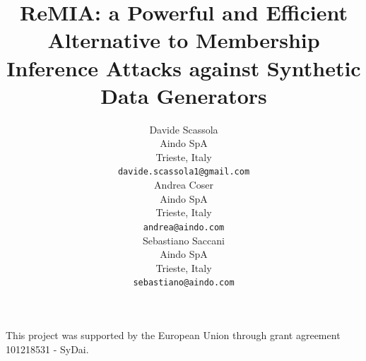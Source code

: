 \documentclass{article}
\title{ReMIA: a Powerful and Efficient Alternative to Membership Inference Attacks against Synthetic Data Generators}
\author{%
  Davide Scassola \\
  Aindo SpA \\
  Trieste, Italy \\
  \texttt{davide.scassola1@gmail.com} \\
  \And
  Andrea Coser \\
  Aindo SpA \\
  Trieste, Italy \\
  \texttt{andrea@aindo.com} \\
  \And
  Sebastiano Saccani \\
  Aindo SpA \\
  Trieste, Italy \\
  \texttt{sebastiano@aindo.com} \\
}
\begin{document}
\maketitle


\begin{abstract}
  
\end{abstract}









\begin{ack}
This project was supported by the European Union through grant agreement 101218531 - SyDai.
\end{ack}






\newpage
\appendix

\end{document}
